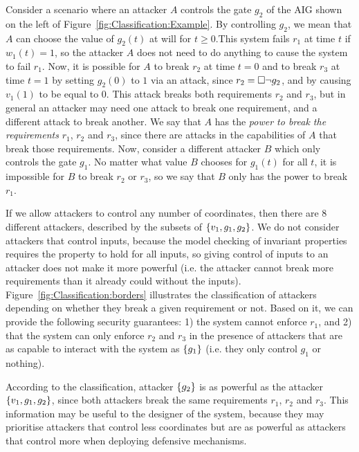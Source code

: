 Consider a scenario where an attacker $A$ controls the gate $g_2$ of the AIG shown on the left of Figure~\ref{fig:Classification:Example}. By controlling $g_2$, we mean that $A$ can choose the value of $g_2(t)$ at will for $t\geq 0$.This system fails $r_1$ at time $t$ if $w_1(t)=1$, so the attacker $A$ does not need to do anything to cause the system to fail $r_1$. Now, it is possible for $A$ to break $r_2$ at time $t=0$ and to break $r_3$ at time $t=1$ by setting $g_2(0)$ to $1$ via an attack, since $r_2={{\square}} \lnot g_2$, and by causing $v_1(1)$ to be equal to $0$. This attack breaks both requirements $r_2$ and $r_3$, but in general an attacker may need one attack to break one requirement, and a different attack to break another. We say that $A$ has the \emph{power to break the requirements} $r_1$, $r_2$ and $r_3$, since there are attacks in the capabilities of $A$ that break those requirements. Now, consider a different attacker $B$ which only controls the gate $g_1$. No matter what value $B$ chooses for $g_1(t)$ for all $t$, it is impossible for $B$ to break $r_2$ or $r_3$, so we say that $B$ only has the power to break $r_1$. 



If we allow attackers to control any number of coordinates, then there are $8$ different attackers, described by the subsets of $\left\{v_1,g_1,g_2\right\}$. We do not consider attackers that control inputs, because the model checking of invariant properties requires the property to hold for all inputs, so giving control of inputs to an attacker does not make it more powerful (i.e. the attacker cannot break more requirements than it already could without the inputs). Figure~\ref{fig:Classification:borders} illustrates the classification of attackers depending on whether they break a given requirement or not. Based on it, we can provide the following security guarantees: 1) the system cannot enforce $r_1$, and 2) that the system can only enforce $r_2$ and $r_3$ in the presence of attackers that are as capable to interact with the system as $\left\{g_1\right\}$ (i.e. they only control $g_1$ or nothing).

According to the classification, attacker $\left\{g_2\right\}$ is as powerful as the attacker $\left\{v_1,g_1,g_2\right\}$, since both attackers break the same requirements $r_1$, $r_2$ and $r_3$. This information may be useful to the designer of the system, because they may prioritise attackers that control less coordinates but are as powerful as attackers that control more when deploying defensive mechanisms.

